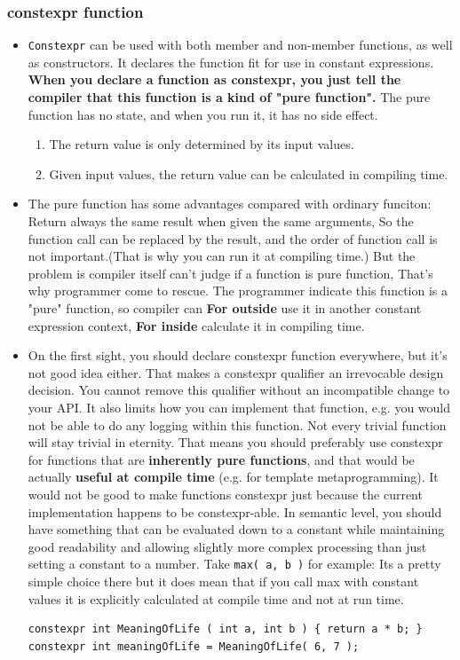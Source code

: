 \documentclass[a4paper,11pt,twoside]{book}
\begin{document}
\subsubsection{constexpr function}
\begin{itemize}
	\item  \texttt{Constexpr} can be used with both member and non-member functions, as well as constructors. It declares the function fit for use in constant expressions. \textbf{When you declare a function as constexpr, you just tell the compiler that this function is a kind of "pure function".} The pure function has no state, and when you run it, it has no side effect. 
	\begin{enumerate}
		\item The return value is only determined by its input values.
		\item Given input values, the return value can be calculated in compiling time. 
	\end{enumerate}
	
	
	\item The pure function has some advantages compared with ordinary funciton: Return always the same result when given the same arguments, So the function call can be replaced by the result, and the order of function call is not important.(That is why you can run it at compiling time.) But the problem is compiler itself can't judge if a function is pure function, That's why programmer come to rescue. The programmer indicate this function is a "pure" function, so compiler can \textbf{For outside} use it in another constant expression context, \textbf{For inside} calculate it in compiling time. 
	
	\item On the first sight, you should declare constexpr function everywhere, but it's not good idea either. That makes a constexpr qualifier an irrevocable design decision. You cannot remove this qualifier without an incompatible change to your API. It also limits how you can implement that function, e.g. you would not be able to do any logging within this function. Not every trivial function will stay trivial in eternity. That means you should preferably use constexpr for functions that are \textbf{inherently pure functions}, and that would be actually \textbf{useful at compile time} (e.g. for template metaprogramming). It would not be good to make functions constexpr just because the current implementation happens to be constexpr-able. In semantic level, you should have something that can be evaluated down to a constant while maintaining good readability and allowing slightly more complex processing than just setting a constant to a number. Take \texttt{max( a, b )} for example: Its a pretty simple choice there but it does mean that if you call max with constant values it is explicitly calculated at compile time and not at run time.
\begin{lstlisting}[numbers=none]
constexpr int MeaningOfLife ( int a, int b ) { return a * b; }
constexpr int meaningOfLife = MeaningOfLife( 6, 7 );
	

\end{lstlisting}
\end{itemize}
\end{document}
